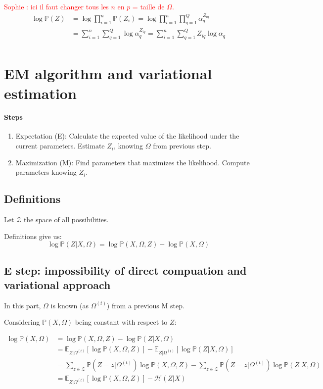 \documentclass[10pt]{article}
\begin{document}
\textcolor{red}{Sophie : ici il faut changer tous les $n$ en $p$ = taille de $\Omega$. }
\begin{align*}
\log \mathbb{P}(Z) &= \log \prod_{i = 1}^n \mathbb{P}(Z_i) = \log \prod_{i = 1}^n \prod_{q = 1}^Q \alpha_q^{Z_{iq}} \\
	&=  \sum_{i = 1}^n \sum_{q = 1}^Q \log \alpha_q^{Z_{iq}} =  \sum_{i = 1}^n \sum_{q = 1}^Q Z_{iq} \log \alpha_q \\
\end{align*}

\section{EM algorithm and variational estimation}

\paragraph{Steps}

\begin{enumerate}
	\item Expectation (E): Calculate the expected value of the likelihood under the current parameters. Estimate $Z_i$, knowing $\Omega$ from previous step.
	\item Maximization (M): Find parameters that maximizes the likelihood. Compute parameters knowing $Z_i$.
\end{enumerate}

\subsection{Definitions} 
Let $\mathcal{Z}$ the space of all possibilities. 

Definitions give us: 
\[ \log \mathbb{P}(Z|X, \Omega) = \log \mathbb{P}(X,\Omega, Z) - \log \mathbb{P}(X, \Omega) \]

\subsection{E step: impossibility of direct compuation and variational approach} 
In this part, $\Omega$ is known (as $\Omega^{(t)}$) from a previous M step.

Considering $\mathbb{P}(X, \Omega)$ being constant with respect to $Z$: 

\begin{align*}
\log \mathbb{P}(X, \Omega) &= \log \mathbb{P}(X,\Omega, Z) - \log \mathbb{P}(Z|X, \Omega) \\
	&= \mathbb{E}_{Z|\Omega^(t)}[\log \mathbb{P}(X,\Omega, Z)] - \mathbb{E}_{Z|\Omega^(t)}[\log \mathbb{P}(Z|X, \Omega)] \\
 	&= \sum_{z\in \mathcal{Z}} \mathbb{P}(Z=z | \Omega^{(t)})\log \mathbb{P}(X,\Omega, Z) - \sum_{z\in \mathcal{Z}} \mathbb{P}(Z=z | \Omega^{(t)}) \log \mathbb{P}(Z|X, \Omega) \\ 	 	
 	& = \mathbb{E}_{Z|\Omega^(t)}[\log \mathbb{P}(X,\Omega, Z)] - \mathcal{H}(Z|X) \\
\end{align*}
\end{document}
